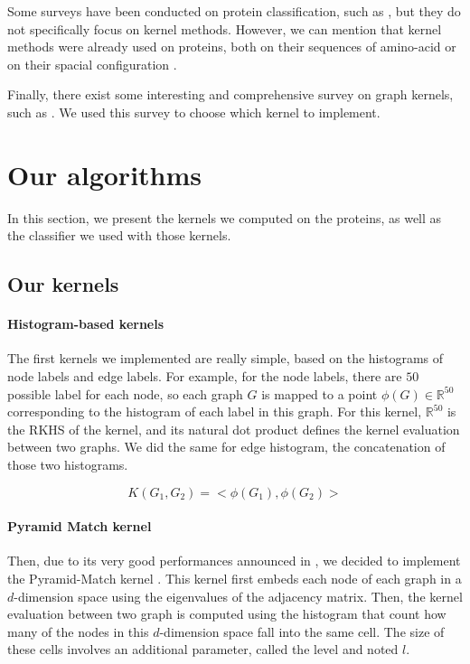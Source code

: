 \documentclass[sigconf, nonacm]{acmart}
\begin{document}
Some surveys have been conducted on protein classification, such as \cite{gupta_protein_2019}, but they do not specifically focus on kernel methods. However, we can mention that kernel methods were already used on proteins, both on their sequences of amino-acid or on their spacial configuration \cite{vert_classification_2006, ben-hur_kernel_2005}.

Finally, there exist some interesting and comprehensive survey on graph kernels, such as \cite{nikolentzos_graph_2021}. We used this survey to choose which kernel to implement.

\section{Our algorithms}

In this section, we present the kernels we computed on the proteins, as well as the classifier we used with those kernels.

\subsection{Our kernels}

\paragraph{Histogram-based kernels}

The first kernels we implemented are really simple, based on the histograms of node labels and edge labels. For example, for the node labels, there are $50$ possible label for each node, so each graph $G$ is mapped to a point $\phi(G) \in \mathbb{R}^{50}$ corresponding to the histogram of each label in this graph. For this kernel, $\mathbb{R}^{50}$ is the RKHS of the kernel, and its natural dot product defines the kernel evaluation between two graphs. We did the same for edge histogram, the concatenation of those two histograms.

$$K(G_1, G_2) = <\phi(G_1), \phi(G_2)>$$

\paragraph{Pyramid Match kernel} 

Then, due to its very good performances announced in \cite{nikolentzos_graph_2021}, we decided to implement the Pyramid-Match kernel \cite{grauman_pyramid_2007}. This kernel first embeds each node of each graph in a $d$-dimension space using the eigenvalues of the adjacency matrix. Then, the kernel evaluation between two graph is computed using the histogram that count how many of the nodes in this $d$-dimension space fall into the same cell. The size of these cells involves an additional parameter, called the level and noted $l$.
\end{document}

